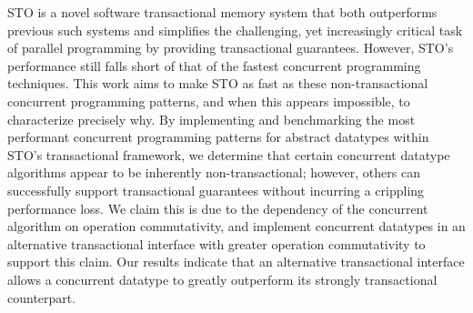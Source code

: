 STO is a novel software transactional memory system that both outperforms previous such systems and simplifies the challenging, yet increasingly critical task of parallel programming by providing transactional guarantees. However, STO's performance still falls short of that of the fastest concurrent programming techniques. This work aims to make STO as fast as these non-transactional concurrent programming patterns, and when this appears impossible, to characterize precisely why. By implementing and benchmarking the most performant concurrent programming patterns for abstract datatypes within STO's transactional framework, we determine that certain concurrent datatype algorithms appear to be inherently non-transactional; however, others can successfully support transactional guarantees without incurring a crippling performance loss. We claim this is due to the dependency of the concurrent algorithm on operation commutativity, and implement concurrent datatypes in an alternative transactional interface with greater operation commutativity to support this claim. Our results indicate that an alternative transactional interface allows a concurrent datatype to greatly outperform its strongly transactional counterpart.

